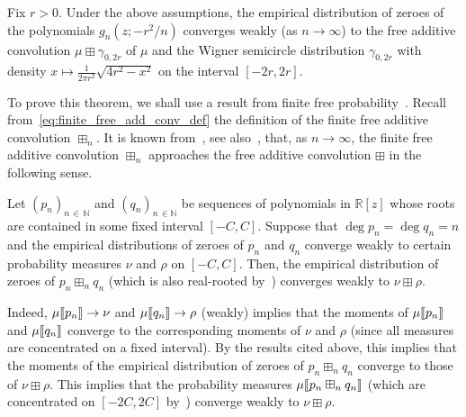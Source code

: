 \documentclass[AHL,Unicode,longabstracts,published]{cedram}
\newcommand{\llbracket}{\mathopen{[\mkern -2.7mu[}}
\newcommand{\rrbracket}{\mathclose{]\mkern -2.7mu]}}
\newcommand{\lsem}{\llbracket}
\newcommand{\rsem}{\rrbracket}
\newcommand{\N}{\mathbb{N}}
\newcommand{\bR}{\mathbb{R}}
\begin{document}
\begin{theo}\label{theo:heat_flow_zeroes_algebraic}
Fix $r>0$. Under the above assumptions, the empirical distribution of zeroes of the polynomials $g_{n}(z; -r^2/n)$ converges weakly (as $n\to\infty$) to the free additive convolution $\mu \boxplus \gamma_{0, 2r}$ of $\mu$ and the Wigner semicircle distribution $\gamma_{0,2r}$ with density $x\mapsto \frac 1 {2\pi r^2} \sqrt{4r^2-x^2}$ on the interval $[-2 r,2r]$.
\end{theo}

To prove this theorem, we shall use a result from finite free probability~\cite{marcus,marcus_spielman_srivastava}. Recall from~\eqref{eq:finite_free_add_conv_def} the definition of the finite free additive convolution $\boxplus_{n}$. It is known from~\cite[Corollary~5.5 and Theorem~5.4]{arizmendi_perales}, see also~\cite[Theorem~4.3]{marcus}, that, as $n\to\infty$, the finite free additive convolution $\boxplus_n$ approaches the free additive convolution $\boxplus$ in the following sense.

\begin{prop}\label{prop:finite_free_add_conv_to_free_add}
Let $(p_n)_{n\,\in\,\N}$ and $(q_n)_{n\,\in \N}$ be sequences of polynomials in $\bR[z]$ whose roots are contained in some fixed interval $[-C,C]$. Suppose that $\deg p_n = \deg q_n = n$ and the empirical distributions of zeroes of $p_n$ and $q_n$ converge weakly to certain probability measures $\nu$ and $\rho$ on $[-C,C]$. Then, the empirical distribution of zeroes of $p_n\boxplus_n q_n$ (which is also real-rooted by~\cite[Theorem~1.3]{marcus_spielman_srivastava}) converges weakly to $\nu\boxplus \rho$.
\end{prop}

Indeed, $\mu\lsem p_n \rsem\to \nu$ and $\mu\lsem q_n \rsem\to \rho$ (weakly) implies that the moments of $\mu\lsem p_n \rsem$ and $\mu\lsem q_n \rsem$ converge to the corresponding moments of $\nu$ and $\rho$ (since all measures are concentrated on a fixed interval). By the results cited above, this implies that the moments of the empirical distribution of zeroes of $p_n\boxplus_n q_n$ converge to those of $\nu\boxplus \rho$. This implies that the probability measures $\mu\lsem p_n \boxplus_n q_n \rsem$ (which are concentrated on $[-2C,2C]$ by~\cite[Theorem~1.3]{marcus_spielman_srivastava}) converge weakly to $\nu \boxplus \rho$.
\end{document}
